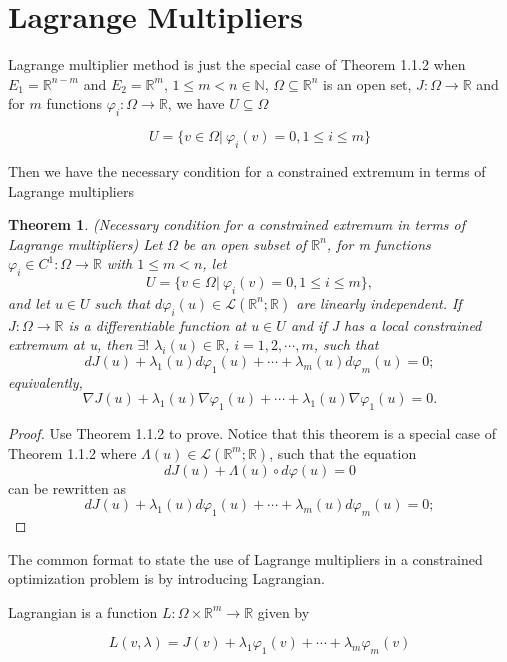 \documentclass[a4paper,12pt]{report}
\newtheorem{theorem}{Theorem}[section]
\begin{document}
\section{Lagrange Multipliers}

Lagrange multiplier method is just the special case of Theorem 1.1.2 when $E_1=\mathbb R^{n-m}$ and $E_2=\mathbb R^m$, $1\leq m < n\in \mathbb N$, $\Omega\subseteq\mathbb R^n$ is an open set, $J:\Omega\to\mathbb R$ and for $m$ functions $\varphi_i:\Omega\to\mathbb R$, we have $U\subseteq \Omega$

\[
    U=\{v\in\Omega|\ \varphi_i(v)=0,1\leq i\leq m\}
\]

Then we have the necessary condition for a constrained extremum in terms of Lagrange multipliers

\begin{theorem}
    (Necessary condition for a constrained extremum in terms of Lagrange multipliers\cite{gallier2019algebra}) Let $\Omega$ be an open subset of $\mathbb R^n$, for m functions $\varphi_i\in C^1:\Omega\to\mathbb R$ with $1\leq m < n$, let
    \[
        U=\{v\in\Omega|\ \varphi_i(v)=0,1\leq i\leq m\},
    \]
    and let $u\in U$ such that $d\varphi_i(u)\in\mathcal L(\mathbb R^n;\mathbb R)$ are linearly independent. If $J:\Omega\to \mathbb R$ is a differentiable function at $u\in U$ and if J has a local constrained extremum at u, then $\exists!$ $\lambda_i(u)\in\mathbb R$, $i=1,2,\cdots,m$, such that
    \[
        dJ(u)+\lambda_1(u)d\varphi_1(u)+\cdots+\lambda_m(u)d\varphi_m(u)=0;
    \]
    equivalently,
    \[
        \nabla J(u)+\lambda_1(u)\nabla\varphi_1(u)+\cdots+\lambda_1(u)\nabla\varphi_1(u)=0.
    \]
\end{theorem}
\begin{proof}
    Use Theorem 1.1.2 to prove. Notice that this theorem is a special case of Theorem 1.1.2 where $\Lambda(u)\in \mathcal L(\mathbb R^m;\mathbb R)$, such that the equation
    \[
        dJ(u)+\Lambda(u)\circ d\varphi(u)=0
    \]
    can be rewritten as 
    \[
        dJ(u)+\lambda_1(u)d\varphi_1(u)+\cdots+\lambda_m(u)d\varphi_m(u)=0;
    \]
\end{proof}

The common format to state the use of Lagrange multipliers in a constrained optimization problem is by introducing Lagrangian. 

Lagrangian is a function $L:\Omega\times\mathbb R^m\to\mathbb R$ given by

\[
    L(v,\lambda)=J(v)+\lambda_1\varphi_1(v)+\cdots+\lambda_m\varphi_m(v)
\]
\end{document}
